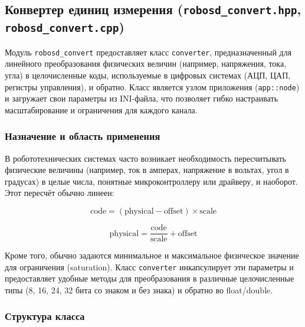 \documentclass[a4paper,12pt]{article}
\begin{document}
\subsection{Конвертер единиц измерения (\texttt{robosd\_convert.hpp}, \texttt{robosd\_convert.cpp})}

Модуль \texttt{robosd\_convert} предоставляет класс \texttt{converter}, предназначенный для линейного преобразования физических величин (например, напряжения, тока, угла) в целочисленные коды, используемые в цифровых системах (АЦП, ЦАП, регистры управления), и обратно. Класс является узлом приложения (\texttt{app::node}) и загружает свои параметры из INI-файла, что позволяет гибко настраивать масштабирование и ограничения для каждого канала.

\subsubsection{Назначение и область применения}

В робототехнических системах часто возникает необходимость пересчитывать физические величины (например, ток в амперах, напряжение в вольтах, угол в градусах) в целые числа, понятные микроконтроллеру или драйверу, и наоборот. Этот пересчёт обычно линеен:

\[
\text{code} = (\text{physical} - \text{offset}) \times \text{scale}
\]

\[
\text{physical} = \frac{\text{code}}{\text{scale}} + \text{offset}
\]

Кроме того, обычно задаются минимальное и максимальное физическое значение для ограничения (saturation). Класс \texttt{converter} инкапсулирует эти параметры и предоставляет удобные методы для преобразования в различные целочисленные типы (8, 16, 24, 32 бита со знаком и без знака) и обратно во float/double.

\subsubsection{Структура класса}
\end{document}
